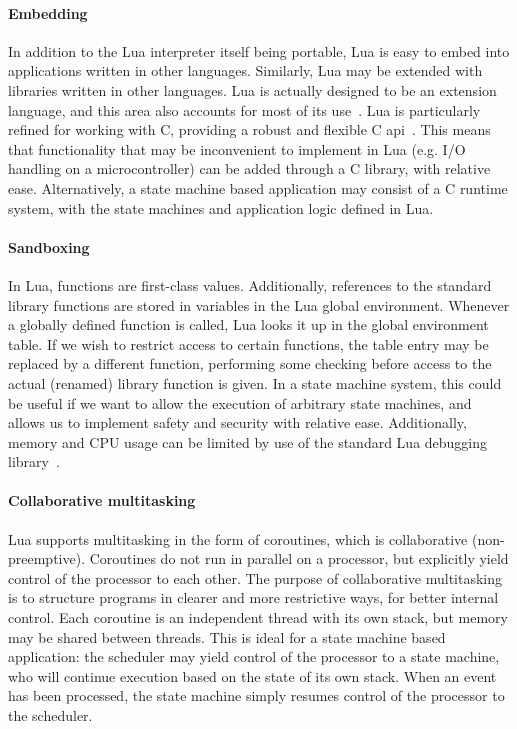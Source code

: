 \paragraph{Embedding}
In addition to the Lua interpreter itself being portable, Lua is easy to embed into applications written in other languages. Similarly, Lua may be extended with libraries written in other languages. Lua is actually designed to be an extension language, and this area also accounts for most of its use~\cite{website:where_lua_is_used}. Lua is particularly refined for working with C, providing a robust and flexible C \gls{api}~\cite[ch. 24]{book:programming_in_lua_first}. This means that functionality that may be inconvenient to implement in Lua (e.g. I/O handling on a microcontroller) can be added through a C library, with relative ease. Alternatively, a state machine based application may consist of a C runtime system, with the state machines and application logic defined in Lua.

\paragraph{Sandboxing}
In Lua, functions are first-class values. Additionally, references to the standard library functions are stored in variables in the Lua global environment. Whenever a globally defined function is called, Lua looks it up in the global environment table. If we wish to restrict access to certain functions, the table entry may be replaced by a different function, performing some checking before access to the actual (renamed) library function is given. In a state machine system, this could be useful if we want to allow the execution of arbitrary state machines, and allows us to implement safety and security with relative ease. Additionally, memory and CPU usage can be limited by use of the standard Lua debugging library~\cite[ch. 6.10]{manual:lua_reference_manual}.

\paragraph{Collaborative multitasking}
Lua supports multitasking in the form of coroutines, which is collaborative (non-preemptive). Coroutines do not run in parallel on a processor, but explicitly yield control of the processor to each other. The purpose of collaborative multitasking is to structure programs in clearer and more restrictive ways, for better internal control. Each coroutine is an independent thread with its own stack, but memory may be shared between threads. This is ideal for a state machine based application: the scheduler may yield control of the processor to a state machine, who will continue execution based on the state of its own stack. When an event has been processed, the state machine simply resumes control of the processor to the scheduler.

